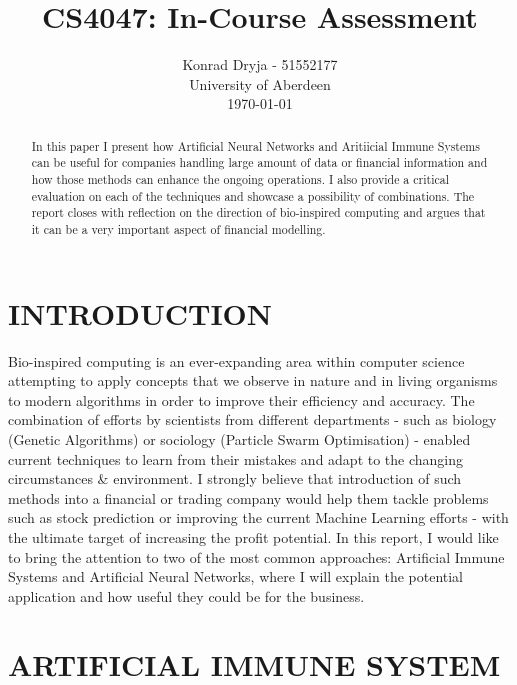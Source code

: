 \documentclass[letterpaper, 10 pt, conference]{ieeeconf}  %
\title{\LARGE \bf
CS4047: In-Course Assessment
}
\author{Konrad Dryja - 51552177 \\
  University of Aberdeen \\
  \today%
}
\begin{document}
\maketitle
\thispagestyle{empty}
\pagestyle{empty}


\begin{abstract}

  In this paper I present how Artificial Neural Networks and Aritiicial Immune Systems can be useful for companies handling large amount of data or financial information and how those methods can enhance the ongoing operations. I also provide a critical evaluation on each of the techniques and showcase a possibility of combinations. The report closes with reflection on the direction of bio-inspired computing and argues that it can be a very important aspect of financial modelling.

\end{abstract}


\section{INTRODUCTION}

Bio-inspired computing is an ever-expanding area within computer science attempting to apply concepts that we observe in nature and in living organisms to modern algorithms in order to improve their efficiency and accuracy. The combination of efforts by scientists from different departments - such as biology (Genetic Algorithms) or sociology (Particle Swarm Optimisation) - enabled current techniques to learn from their mistakes and adapt to the changing circumstances \& environment. I strongly believe that introduction of such methods into a financial or trading company would help them tackle problems such as stock prediction \cite{gunasekaran2011evaluation} or improving the current Machine Learning efforts - with the ultimate target of increasing the profit potential. In this report, I would like to bring the attention to two of the most common approaches: Artificial Immune Systems and Artificial Neural Networks, where I will explain the potential application and how useful they could be for the business.

\section{ARTIFICIAL IMMUNE SYSTEM}
\end{document}
